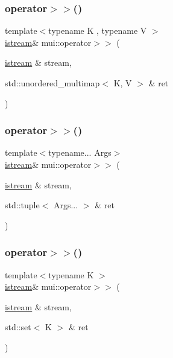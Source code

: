 \mbox{\label{namespacemui_ac8e839af83c9b533659a10af207a0da7}} 
\subsubsection{\texorpdfstring{operator$>$$>$()}{operator>>()}\hspace{0.1cm}{\footnotesize\ttfamily [7/20]}}
{\footnotesize\ttfamily template$<$typename K , typename V $>$ \\
\hyperlink{classmui_1_1istream}{istream}\& mui\+::operator$>$$>$ (\begin{DoxyParamCaption}\item[{\hyperlink{classmui_1_1istream}{istream} \&}]{stream,  }\item[{std\+::unordered\+\_\+multimap$<$ K, V $>$ \&}]{ret }\end{DoxyParamCaption})\hspace{0.3cm}{\ttfamily [inline]}}

\mbox{\label{namespacemui_ad781b9969378810aa4b2837f96e72631}} 
\subsubsection{\texorpdfstring{operator$>$$>$()}{operator>>()}\hspace{0.1cm}{\footnotesize\ttfamily [8/20]}}
{\footnotesize\ttfamily template$<$typename... Args$>$ \\
\hyperlink{classmui_1_1istream}{istream}\& mui\+::operator$>$$>$ (\begin{DoxyParamCaption}\item[{\hyperlink{classmui_1_1istream}{istream} \&}]{stream,  }\item[{std\+::tuple$<$ Args... $>$ \&}]{ret }\end{DoxyParamCaption})\hspace{0.3cm}{\ttfamily [inline]}}

\mbox{\label{namespacemui_af5f7e7c2c8fb5cf56e439ba5f92bc322}} 
\subsubsection{\texorpdfstring{operator$>$$>$()}{operator>>()}\hspace{0.1cm}{\footnotesize\ttfamily [9/20]}}
{\footnotesize\ttfamily template$<$typename K $>$ \\
\hyperlink{classmui_1_1istream}{istream}\& mui\+::operator$>$$>$ (\begin{DoxyParamCaption}\item[{\hyperlink{classmui_1_1istream}{istream} \&}]{stream,  }\item[{std\+::set$<$ K $>$ \&}]{ret }\end{DoxyParamCaption})\hspace{0.3cm}{\ttfamily [inline]}}

